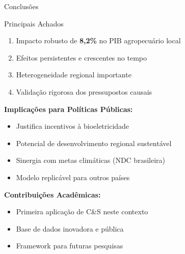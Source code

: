 \documentclass[10pt,aspectratio=169]{beamer}
\begin{document}
\begin{frame}{Conclusões}
\begin{block}{Principais Achados}
\begin{enumerate}
    \item Impacto robusto de \textbf{8,2\%} no PIB agropecuário local
    \item Efeitos persistentes e crescentes no tempo
    \item Heterogeneidade regional importante
    \item Validação rigorosa dos pressupostos causais
\end{enumerate}
\end{block}

\textbf{Implicações para Políticas Públicas:}
\begin{itemize}
    \item Justifica incentivos à bioeletricidade
    \item Potencial de desenvolvimento regional sustentável
    \item Sinergia com metas climáticas (NDC brasileira)
    \item Modelo replicável para outros países
\end{itemize}

\textbf{Contribuições Acadêmicas:}
\begin{itemize}
    \item Primeira aplicação de C\&S neste contexto
    \item Base de dados inovadora e pública
    \item Framework para futuras pesquisas
\end{itemize}
\end{frame}
\end{document}
